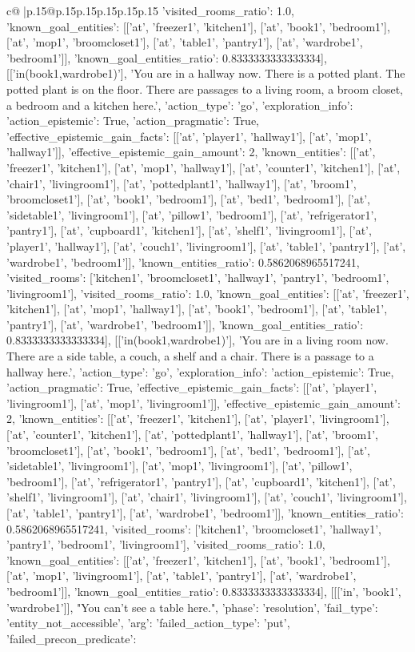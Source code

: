 \documentclass{article}
\begin{document}
{\begin{supertabular}{c@{$\;$}|p{.15\linewidth}@{}p{.15\linewidth}p{.15\linewidth}p{.15\linewidth}p{.15\linewidth}p{.15\linewidth}}
{{{'visited_rooms_ratio': 1.0, 'known_goal_entities': [['at', 'freezer1', 'kitchen1'], ['at', 'book1', 'bedroom1'], ['at', 'mop1', 'broomcloset1'], ['at', 'table1', 'pantry1'], ['at', 'wardrobe1', 'bedroom1']], 'known_goal_entities_ratio': 0.8333333333333334}}], [['in(book1,wardrobe1)'], 'You are in a hallway now. There is a potted plant. The potted plant is on the floor. There are passages to a living room, a broom closet, a bedroom and a kitchen here.', {'action_type': 'go', 'exploration_info': {'action_epistemic': True, 'action_pragmatic': True, 'effective_epistemic_gain_facts': [['at', 'player1', 'hallway1'], ['at', 'mop1', 'hallway1']], 'effective_epistemic_gain_amount': 2, 'known_entities': [['at', 'freezer1', 'kitchen1'], ['at', 'mop1', 'hallway1'], ['at', 'counter1', 'kitchen1'], ['at', 'chair1', 'livingroom1'], ['at', 'pottedplant1', 'hallway1'], ['at', 'broom1', 'broomcloset1'], ['at', 'book1', 'bedroom1'], ['at', 'bed1', 'bedroom1'], ['at', 'sidetable1', 'livingroom1'], ['at', 'pillow1', 'bedroom1'], ['at', 'refrigerator1', 'pantry1'], ['at', 'cupboard1', 'kitchen1'], ['at', 'shelf1', 'livingroom1'], ['at', 'player1', 'hallway1'], ['at', 'couch1', 'livingroom1'], ['at', 'table1', 'pantry1'], ['at', 'wardrobe1', 'bedroom1']], 'known_entities_ratio': 0.5862068965517241, 'visited_rooms': ['kitchen1', 'broomcloset1', 'hallway1', 'pantry1', 'bedroom1', 'livingroom1'], 'visited_rooms_ratio': 1.0, 'known_goal_entities': [['at', 'freezer1', 'kitchen1'], ['at', 'mop1', 'hallway1'], ['at', 'book1', 'bedroom1'], ['at', 'table1', 'pantry1'], ['at', 'wardrobe1', 'bedroom1']], 'known_goal_entities_ratio': 0.8333333333333334}}], [['in(book1,wardrobe1)'], 'You are in a living room now. There are a side table, a couch, a shelf and a chair. There is a passage to a hallway here.', {'action_type': 'go', 'exploration_info': {'action_epistemic': True, 'action_pragmatic': True, 'effective_epistemic_gain_facts': [['at', 'player1', 'livingroom1'], ['at', 'mop1', 'livingroom1']], 'effective_epistemic_gain_amount': 2, 'known_entities': [['at', 'freezer1', 'kitchen1'], ['at', 'player1', 'livingroom1'], ['at', 'counter1', 'kitchen1'], ['at', 'pottedplant1', 'hallway1'], ['at', 'broom1', 'broomcloset1'], ['at', 'book1', 'bedroom1'], ['at', 'bed1', 'bedroom1'], ['at', 'sidetable1', 'livingroom1'], ['at', 'mop1', 'livingroom1'], ['at', 'pillow1', 'bedroom1'], ['at', 'refrigerator1', 'pantry1'], ['at', 'cupboard1', 'kitchen1'], ['at', 'shelf1', 'livingroom1'], ['at', 'chair1', 'livingroom1'], ['at', 'couch1', 'livingroom1'], ['at', 'table1', 'pantry1'], ['at', 'wardrobe1', 'bedroom1']], 'known_entities_ratio': 0.5862068965517241, 'visited_rooms': ['kitchen1', 'broomcloset1', 'hallway1', 'pantry1', 'bedroom1', 'livingroom1'], 'visited_rooms_ratio': 1.0, 'known_goal_entities': [['at', 'freezer1', 'kitchen1'], ['at', 'book1', 'bedroom1'], ['at', 'mop1', 'livingroom1'], ['at', 'table1', 'pantry1'], ['at', 'wardrobe1', 'bedroom1']], 'known_goal_entities_ratio': 0.8333333333333334}}], [[['in', 'book1', 'wardrobe1']], "You can't see a table here.", {'phase': 'resolution', 'fail_type': 'entity_not_accessible', 'arg': {'failed_action_type': 'put', 'failed_precon_predicate': }}}
\end{supertabular}}
\end{document}
